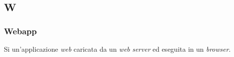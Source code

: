 \subsection{W}

\subsubsection{Webapp}
Si un'applicazione \textit{web} caricata da un \textit{web} \textit{server} ed eseguita in un \textit{browser}.

\newpage
